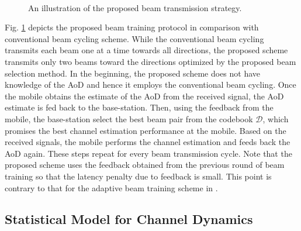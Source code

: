 \documentclass[conference]{IEEEtran}
\begin{document}
\begin{figure} [t]
 \centering
 \\
 \caption{An illustration of the proposed beam transmission strategy.} \label{fig:pro_scheme}
\end{figure}
Fig. \ref{fig:pro_scheme} depicts the proposed beam training protocol in comparison with conventional beam cycling scheme.
While the conventional beam cycling transmits each beam one at a time towards all directions, the proposed scheme transmits only two beams toward the directions optimized by the proposed beam selection method. In the beginning, the proposed scheme does not have knowledge of the AoD and hence
 it employs the conventional beam cycling. Once the mobile obtains the estimate of the AoD from the received signal, the AoD estimate is fed back to the base-station.  Then, using the feedback from the mobile, the base-station
select the best beam pair from the codebook $\mathcal{D}$, which promises the best channel estimation performance at the mobile.
Based on the received signals, the mobile performs the channel estimation and feeds back the AoD again. These steps repeat for every beam transmission cycle.
Note that the proposed scheme uses the feedback obtained from the previous round of beam training  so that  the latency penalty due to feedback is small. This point is contrary to that for the adaptive beam training scheme in \cite{ref:ad_beam_Ayach}.

\subsection{Statistical Model for Channel Dynamics} \label{subsec:statistical_model}
\end{document}
